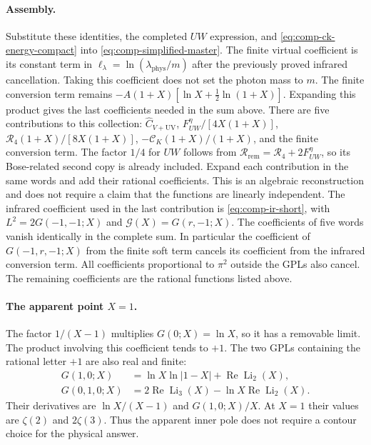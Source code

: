 \paragraph{Assembly.} Substitute these identities, the completed $UW$ expression, and \eqref{eq:comp-ck-energy-compact} into \eqref{eq:comp-simplified-master}. The finite virtual coefficient is its constant term in $\ell_\lambda=\ln(\lambda_{\mathrm{phys}}/m)$ after the previously proved infrared cancellation. Taking this coefficient does not set the photon mass to $m$. The finite conversion term remains $-A(1+X)[\ln X+\tfrac12\ln(1+X)]$. Expanding this product gives the last coefficients needed in the sum above.
There are five contributions to this collection: $\widehat C_{V+\mathrm{UV}}$, $F_{UW}^{\eta}/[4X(1+X)]$, $\mathcal R_4(1+X)/[8X(1+X)]$, $-\mathcal C_K(1+X)/(1+X)$, and the finite conversion term. The factor $1/4$ for $UW$ follows from $\mathcal R_{\mathrm{rem}}=\mathcal R_4+2F_{UW}^{\eta}$, so its Bose-related second copy is already included. Expand each contribution in the same words and add their rational coefficients. This is an algebraic reconstruction and does not require a claim that the functions are linearly independent. The infrared coefficient used in the last contribution is \eqref{eq:comp-ir-short}, with $L^2=2G(-1,-1;X)$ and $\mathcal G(X)=G(r,-1;X)$.
The coefficients of five words vanish identically in the complete sum. In particular the coefficient of $G(-1,r,-1;X)$ from the finite soft term cancels its coefficient from the infrared conversion term. All coefficients proportional to $\pi^2$ outside the GPLs also cancel. The remaining coefficients are the rational functions listed above.
\paragraph{The apparent point $X=1$.} The factor $1/(X-1)$ multiplies $G(0;X)=\ln X$, so it has a removable limit. The product involving this coefficient tends to $+1$. The two GPLs containing the rational letter $+1$ are also real and finite:
\begin{align}
G(1,0;X)&=\ln X\ln|1-X|+\operatorname{Re}\operatorname{Li}_2(X),\\
G(0,1,0;X)&=2\operatorname{Re}\operatorname{Li}_3(X)-\ln X\operatorname{Re}\operatorname{Li}_2(X).
\end{align}
Their derivatives are $\ln X/(X-1)$ and $G(1,0;X)/X$. At $X=1$ their values are $\zeta(2)$ and $2\zeta(3)$. Thus the apparent inner pole does not require a contour choice for the physical answer.
